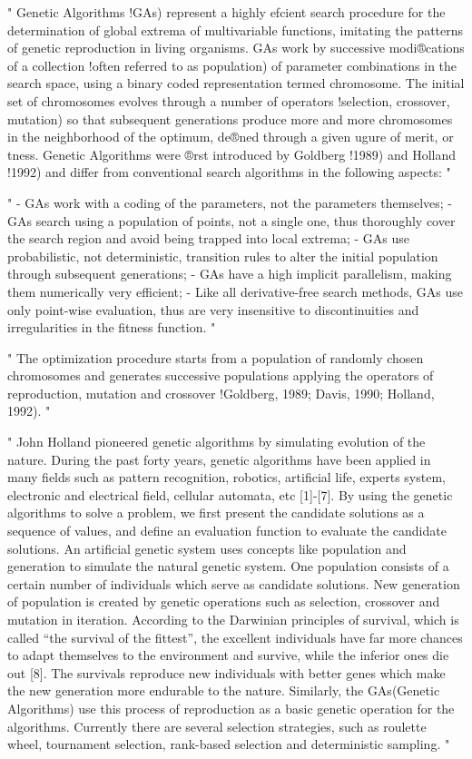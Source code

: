 "
Genetic Algorithms !GAs) represent a highly efcient search procedure for the determination of global extrema of multivariable functions, imitating the patterns of genetic reproduction in living organisms. GAs work by successive modi®cations of a collection !often referred to as population) of parameter combinations in the search space, using a binary coded representation termed chromosome. The initial set of chromosomes evolves through a number of operators !selection, crossover, mutation) so that subsequent generations produce more and more chromosomes in the neighborhood of the optimum, de®ned through a given ugure of merit, or tness. Genetic Algorithms were ®rst introduced by Goldberg !1989) and Holland !1992) and differ from conventional search algorithms in the following aspects:
"\cite{marsili_libelli_adaptive_2000}

"
- GAs work with a coding of the parameters, not the parameters themselves; 
- GAs search using a population of points, not a single one, thus thoroughly cover the search region and avoid being trapped into local extrema; 
- GAs use probabilistic, not deterministic, transition rules to alter the initial population through subsequent generations; 
- GAs have a high implicit parallelism, making them numerically very efficient; 
- Like all derivative-free search methods, GAs use only point-wise evaluation, thus are very insensitive to discontinuities and irregularities in the fitness function.
"\cite{marsili_libelli_adaptive_2000}

"
The optimization procedure starts from a population of randomly chosen chromosomes and generates successive populations applying the operators of reproduction, mutation and crossover !Goldberg, 1989; Davis, 1990; Holland, 1992).
"\cite{marsili_libelli_adaptive_2000}


"
John Holland pioneered genetic algorithms by simulating evolution of the nature. During the past forty years, genetic algorithms have been applied in many fields such as pattern recognition, robotics, artificial life, experts system, electronic and electrical field, cellular automata, etc [1]-[7]. By using the genetic algorithms to solve a problem, we first present the candidate solutions as a sequence of values, and define an evaluation function to evaluate the candidate solutions. An artificial genetic system uses concepts like population and generation to simulate the natural genetic system. One population consists of a certain number of individuals which serve as candidate solutions. New generation of population is created by genetic operations such as selection, crossover and mutation in iteration. According to the Darwinian principles of survival, which is called “the survival of the fittest”, the excellent individuals have far more chances to adapt themselves to the environment and survive, while the inferior ones die out [8]. The survivals reproduce new individuals with better genes which make the new generation more endurable to the nature. Similarly, the GAs(Genetic Algorithms) use this process of reproduction as a basic genetic operation for the algorithms. Currently there are several selection strategies, such as roulette wheel, tournament selection, rank-based selection and deterministic sampling.
"\cite{jinghui_zhong_comparison_2005}



